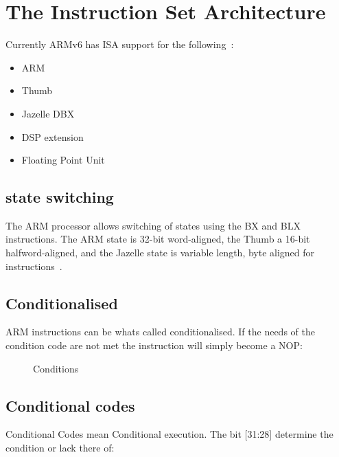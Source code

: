 \documentclass[11pt]{report}
\begin{document}
\section{The Instruction Set Architecture}
Currently ARMv6 has ISA support for the following~\citep{ARM1176}:
\begin{itemize}
\item ARM
\item Thumb\textregistered
\item Jazelle DBX\textregistered
\item DSP extension
\item Floating Point Unit
\end{itemize}
\begin{onehalfspace}
\subsection{state switching}
The ARM processor allows switching of states using the BX and BLX instructions. The ARM state is 32-bit word-aligned, the Thumb a 16-bit halfword-aligned, and the Jazelle state is variable length, byte aligned for instructions~\citep[2-12]{arm1176jzf-s}.
\subsection{Conditionalised}
ARM instructions can be whats called conditionalised. If the needs of the condition code are not met the instruction will simply become a NOP:
\end{onehalfspace}

\begin{figure}[H]
\caption{Conditions}
\end{figure}


\begin{onehalfspace}

\subsection{Conditional codes}
Conditional Codes mean Conditional execution. The bit [31:28] determine the condition or lack there of:
\end{onehalfspace}
\end{document}
